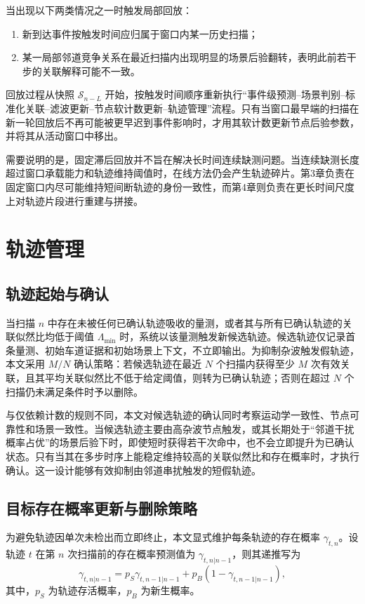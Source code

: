 \documentclass{xdupgthesis}
\begin{document}
当出现以下两类情况之一时触发局部回放：
\begin{enumerate}
	\item 新到达事件按触发时间应归属于窗口内某一历史扫描；
	\item 某一局部邻道竞争关系在最近扫描内出现明显的场景后验翻转，表明此前若干步的关联解释可能不一致。
\end{enumerate}
回放过程从快照 $\mathcal S_{n-L}$ 开始，按触发时间顺序重新执行“事件级预测--场景判别--标准化关联--滤波更新--节点软计数更新--轨迹管理”流程。只有当窗口最早端的扫描在新一轮回放后不再可能被更早迟到事件影响时，才用其软计数更新节点后验参数，并将其从活动窗口中移出。

需要说明的是，固定滞后回放并不旨在解决长时间连续缺测问题。当连续缺测长度超过窗口承载能力和轨迹维持阈值时，在线方法仍会产生轨迹碎片。第3章负责在固定窗口内尽可能维持短间断轨迹的身份一致性，而第4章则负责在更长时间尺度上对轨迹片段进行重建与拼接。

\section{轨迹管理}
\label{sec:ch3_track_management}

\subsection{轨迹起始与确认}

当扫描 $n$ 中存在未被任何已确认轨迹吸收的量测，或者其与所有已确认轨迹的关联似然比均低于阈值 $\Lambda_{\min}$ 时，系统以该量测触发新候选轨迹。候选轨迹仅记录首条量测、初始车道证据和初始场景上下文，不立即输出。为抑制杂波触发假轨迹，本文采用 $M/N$ 确认策略：若候选轨迹在最近 $N$ 个扫描内获得至少 $M$ 次有效关联，且其平均关联似然比不低于给定阈值，则转为已确认轨迹；否则在超过 $N$ 个扫描仍未满足条件时予以删除。

与仅依赖计数的规则不同，本文对候选轨迹的确认同时考察运动学一致性、节点可靠性和场景一致性。当候选轨迹主要由高杂波节点触发，或其长期处于“邻道干扰概率占优”的场景后验下时，即使短时获得若干次命中，也不会立即提升为已确认状态。只有当其在多步时序上能稳定维持较高的关联似然比和存在概率时，才执行确认。这一设计能够有效抑制由邻道串扰触发的短假轨迹。

\subsection{目标存在概率更新与删除策略}

为避免轨迹因单次未检出而立即终止，本文显式维护每条轨迹的存在概率 $\gamma_{t,n}$。设轨迹 $t$ 在第 $n$ 次扫描前的存在概率预测值为 $\gamma_{t,n|n-1}$，则其递推写为
\begin{equation}
	\gamma_{t,n|n-1}=p_S\gamma_{t,n-1|n-1}+p_B\left(1-\gamma_{t,n-1|n-1}\right),
	\label{eq:ch3_exist_predict_v2}
\end{equation}
其中，$p_S$ 为轨迹存活概率，$p_B$ 为新生概率。
\end{document}
